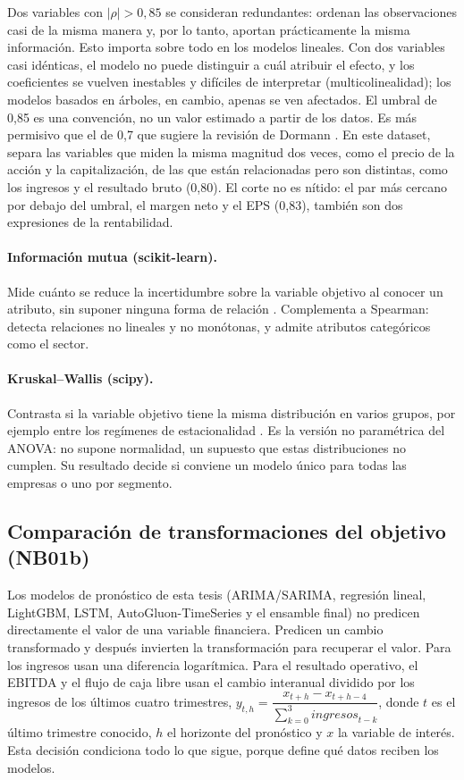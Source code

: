 \documentclass[12pt,letterpaper,oneside]{report}
\renewcommand{\_}{\UnderscoreOriginal\allowbreak}
\begin{document}
Dos variables con $|\rho| > 0{,}85$ se consideran redundantes: ordenan las observaciones casi de la misma manera y, por lo tanto, aportan prácticamente la misma información. Esto importa sobre todo en los modelos lineales. Con dos variables casi idénticas, el modelo no puede distinguir a cuál atribuir el efecto, y los coeficientes se vuelven inestables y difíciles de interpretar (multicolinealidad); los modelos basados en árboles, en cambio, apenas se ven afectados. El umbral de 0,85 es una convención, no un valor estimado a partir de los datos. Es más permisivo que el de 0,7 que sugiere la revisión de Dormann \parencite{dormann2013collinearity}. En este dataset, separa las variables que miden la misma magnitud dos veces, como el precio de la acción y la capitalización, de las que están relacionadas pero son distintas, como los ingresos y el resultado bruto (0,80). El corte no es nítido: el par más cercano por debajo del umbral, el margen neto y el EPS (0,83), también son dos expresiones de la rentabilidad.

\paragraph{Información mutua (scikit-learn).} Mide cuánto se reduce la incertidumbre sobre la variable objetivo al conocer un atributo, sin suponer ninguna forma de relación \parencite{kraskov2004estimating}. Complementa a Spearman: detecta relaciones no lineales y no monótonas, y admite atributos categóricos como el sector.

\paragraph{Kruskal--Wallis (scipy).} Contrasta si la variable objetivo tiene la misma distribución en varios grupos, por ejemplo entre los regímenes de estacionalidad \parencite{kruskal1952use}. Es la versión no paramétrica del ANOVA: no supone normalidad, un supuesto que estas distribuciones no cumplen. Su resultado decide si conviene un modelo único para todas las empresas o uno por segmento.

\subsection{Comparación de transformaciones del objetivo (NB01b)}
\label{sec:met-transformaciones}

Los modelos de pronóstico de esta tesis (ARIMA/SARIMA, regresión lineal, LightGBM, LSTM, AutoGluon-TimeSeries y el ensamble final) no predicen directamente el valor de una variable financiera. Predicen un cambio transformado y después invierten la transformación para recuperar el valor. Para los ingresos usan una diferencia logarítmica. Para el resultado operativo, el EBITDA y el flujo de caja libre usan el cambio interanual dividido por los ingresos de los últimos cuatro trimestres, $y_{t,h} = \dfrac{x_{t+h} - x_{t+h-4}}{\sum_{k=0}^{3} \mathit{ingresos}_{t-k}}$, donde $t$ es el último trimestre conocido, $h$ el horizonte del pronóstico y $x$ la variable de interés. Esta decisión condiciona todo lo que sigue, porque define qué datos reciben los modelos.
\end{document}

